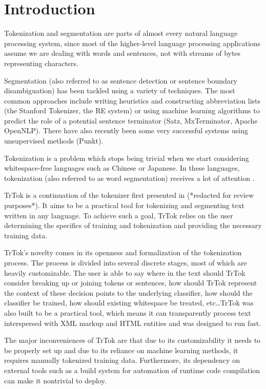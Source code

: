 \section{Introduction}
\label{sec:introduction}

Tokenization and segmentation are parts of almost every natural
language processing system, since most of the higher-level language
processing applications assume we are dealing with words and
sentences, not with streams of bytes representing characters.

Segmentation (also referred to as sentence detection or sentence
boundary disambiguation) has been tackled using a variety of
techniques. The most common approaches include writing heuristics and
constructing abbreviation lists (the Stanford Tokenizer, the RE
system) or using machine learning algorithms to predict the role of a
potential sentence terminator (Satz, MxTerminator, Apache OpenNLP).
There have also recently been some very successful systems using
unsupervised methods (Punkt).

Tokenization is a problem which stops being trivial when we start
considering whitespace-free languages such as Chinese or Japanese. In
these languages, tokenization (also referred to as word segmentation)
receives a lot of attention \cite{seg-bakeoff}.

TrTok is a continuation of the tokenizer first presented in (*redacted
for review purposes*). It aims to be a practical tool for tokenizing
and segmenting text written in any language. To achieve such a goal,
TrTok relies on the user determining the specifics of training and
tokenization and providing the necessary training data.

TrTok's novelty comes in its openness and formalization of the
tokenization process. The process is divided into several discrete
stages, most of which are heavily customizable. The user is able to
say where in the text should TrTok consider breaking up or joining
tokens or sentences, how should TrTok represent the context of these
decision points to the underlying classifier, how should the
classifier be trained, how should existing whitespace be treated,
etc\ldots TrTok was also built to be a practical tool, which means it
can transparently process text interspersed with XML markup and HTML
entities and was designed to run fast.

The major inconveniences of TrTok are that due to its customizability
it needs to be properly set up and due to its reliance on machine
learning methods, it requires manually tokenized training data.
Furthermore, its dependency on external tools such as a build system
for automation of runtime code compilation can make it nontrivial to
deploy.
